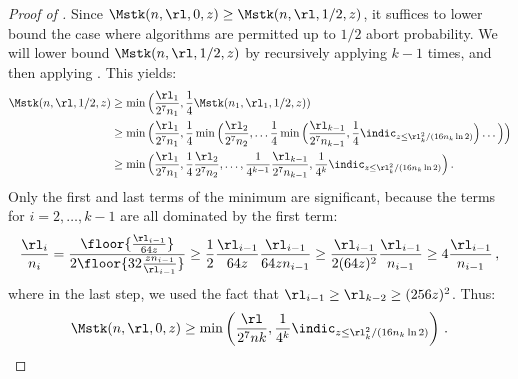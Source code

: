 \begin{itemize}
\begin{itemize}
\begin{proof}[Proof of ]
  Since $\Mstk(n,\rl,0,z) \ge \Mstk(n,\rl,1/2,z)$, it suffices to lower bound the case where algorithms are permitted up to $1/2$ abort probability. We will lower bound $\Mstk(n,\rl,1/2,z)$ by recursively applying
   $k-1$ times, and then applying
  . This yields:
  \begin{align*}
    \Mstk(n,\rl,1/2,z) &\ge \min\Big(\frac{\rl_1}{2^7 n_1}, \frac{1}{4} \Mstk(n_1,\rl_1,1/2,z)) \\
      &\ge \min\Big(\frac{\rl_1}{2^7 n_1}, \frac{1}{4} \min\Big(\frac{\rl_2}{2^7 n_2}, \ldots \frac{1}{4} \min\Big(\frac{\rl_{k-1}}{2^7 n_{k-1}},  \frac{1}{4} \indic_{z \le \rl_k^2 / (16 n_k \ln 2)} \Big)\ldots\Big)\Big) \\
      &\ge \min\Big(\frac{\rl_1}{2^7 n_1}, \frac{1}{4} \frac{\rl_2}{2^7 n_2},
      \ldots, \frac{1}{4^{k-1}} \frac{\rl_{k-1}}{2^7 n_{k-1}}, \frac{1}{4^k} \indic_{z \le \rl_k^2 / (16 n_k \ln 2)} \Big) \,.
  \end{align*}
  Only the first and last terms of the minimum are significant, because the terms for $i = 2,\ldots,{k-1}$ are all dominated by the first term:
  \begin{align*}
    \frac{\rl_i}{n_i} = \frac{\floor{\frac{\rl_{i-1}}{64 z} }}{2 \floor{32 \frac{z n_{i-1}}{\rl_{i-1}} } } \ge \frac{1}{2} \frac{\rl_{i-1}}{64 z} \frac{\rl_{i-1}}{64 z n_{i-1}} \ge \frac{\rl_{i-1}}{2 (64 z)^2} \frac{\rl_{i-1}}{n_{i-1}} \ge 4 \frac{\rl_{i-1}}{n_{i-1}} \,,
  \end{align*}
  where in the last step, we used the fact that $\rl_{i-1} \ge \rl_{k-2} \ge (256 z)^2$. Thus:
  \begin{align*}
    \Mstk(n,\rl,0,z) \ge \min\left(\frac{\rl}{2^{7} n k}, \frac{1}{4^k} \indic_{z \le \rl_k^2 / (16 n_k \ln 2)} \right) \,.
  \end{align*}
  

\end{proof}
\end{itemize}
\end{itemize}
